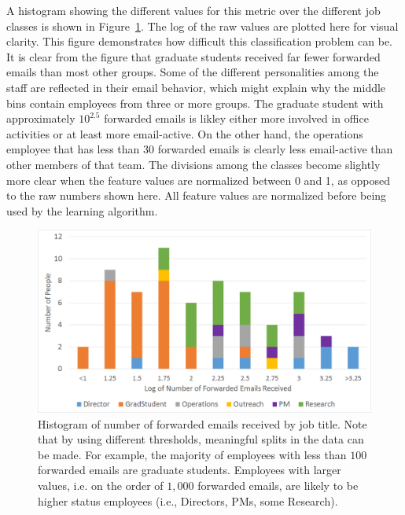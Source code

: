 \documentclass[12pt]{report}
\begin{document}
A histogram showing the different values for this metric over the different job classes is shown in Figure~\ref{fig:traffic_ex_hist}.
The log of the raw values are plotted here for visual clarity.
This figure demonstrates how difficult this classification problem can be.
It is clear from the figure that graduate students received far fewer forwarded emails than most other groups.
Some of the different personalities among the staff are reflected in their email behavior, which might explain why the middle bins contain employees from three or more groups.
The graduate student with approximately $10^{2.5}$ forwarded emails is likley either more involved in office activities or at least more email-active.  
On the other hand, the operations employee that has less than $30$ forwarded emails is clearly less email-active than other members of that team.
The divisions among the classes become slightly more clear when the feature values are normalized between 0 and 1, as opposed to the raw numbers shown here.
All feature values are normalized before being used by the learning algorithm.
\begin{figure}[t]
    \centering
        \includegraphics[width=\columnwidth,trim={0mm 0mm 0mm 0mm},clip]{FW_hist}
        \caption[Forwarded emails received histogram]{Histogram of number of forwarded emails received by job title.  Note that by using different thresholds, meaningful splits in the data can be made.  For example, the majority of employees with less than $100$ forwarded emails are graduate students. Employees with larger values, i.e. on the order of $1,000$ forwarded emails, are likely to be higher status employees (i.e., Directors, PMs, some Research).}
        \label{fig:traffic_ex_hist}
\end{figure}
\end{document}
